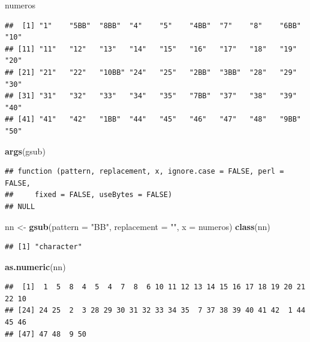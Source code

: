 \documentclass[]{book}
\newenvironment{Shaded}{\begin{snugshade}}{\end{snugshade}}
\newcommand{\KeywordTok}[1]{\textcolor[rgb]{0.13,0.29,0.53}{\textbf{#1}}}
\newcommand{\DataTypeTok}[1]{\textcolor[rgb]{0.13,0.29,0.53}{#1}}
\newcommand{\StringTok}[1]{\textcolor[rgb]{0.31,0.60,0.02}{#1}}
\newcommand{\NormalTok}[1]{#1}
\theoremstyle{definition}
\theoremstyle{definition}
\theoremstyle{definition}
\theoremstyle{remark}
\begin{document}
\begin{Shaded}
\begin{Highlighting}[]
\NormalTok{numeros}
\end{Highlighting}
\end{Shaded}

\begin{verbatim}
##  [1] "1"    "5BB"  "8BB"  "4"    "5"    "4BB"  "7"    "8"    "6BB"  "10"  
## [11] "11"   "12"   "13"   "14"   "15"   "16"   "17"   "18"   "19"   "20"  
## [21] "21"   "22"   "10BB" "24"   "25"   "2BB"  "3BB"  "28"   "29"   "30"  
## [31] "31"   "32"   "33"   "34"   "35"   "7BB"  "37"   "38"   "39"   "40"  
## [41] "41"   "42"   "1BB"  "44"   "45"   "46"   "47"   "48"   "9BB"  "50"
\end{verbatim}

\begin{Shaded}
\begin{Highlighting}[]
\KeywordTok{args}\NormalTok{(gsub)}
\end{Highlighting}
\end{Shaded}

\begin{verbatim}
## function (pattern, replacement, x, ignore.case = FALSE, perl = FALSE, 
##     fixed = FALSE, useBytes = FALSE) 
## NULL
\end{verbatim}

\begin{Shaded}
\begin{Highlighting}[]
\NormalTok{nn <-}\StringTok{ }\KeywordTok{gsub}\NormalTok{(}\DataTypeTok{pattern =} \StringTok{"BB"}\NormalTok{, }\DataTypeTok{replacement =} \StringTok{""}\NormalTok{, }\DataTypeTok{x =}\NormalTok{ numeros)}
\KeywordTok{class}\NormalTok{(nn)}
\end{Highlighting}
\end{Shaded}

\begin{verbatim}
## [1] "character"
\end{verbatim}

\begin{Shaded}
\begin{Highlighting}[]
\KeywordTok{as.numeric}\NormalTok{(nn)}
\end{Highlighting}
\end{Shaded}

\begin{verbatim}
##  [1]  1  5  8  4  5  4  7  8  6 10 11 12 13 14 15 16 17 18 19 20 21 22 10
## [24] 24 25  2  3 28 29 30 31 32 33 34 35  7 37 38 39 40 41 42  1 44 45 46
## [47] 47 48  9 50
\end{verbatim}
\end{document}
